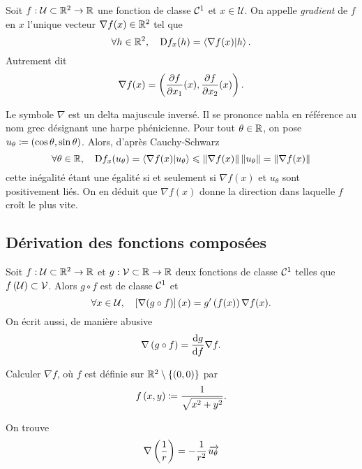 \documentclass{magnolia}
\begin{document}
\begin{definition}
Soit $f:\mathcal{U}\subset\mathbb{R}^2\to\mathbb{R}$ une fonction de classe $\mathcal{C}^{1}$ et
$x\in\mathcal{U}$. On appelle \emph{gradient} de $f$ en $x$ l'unique vecteur
$\nabla f(x)\in\mathbb{R}^2$ tel que
\[\forall h\in\mathbb{R}^2 ,\quad {\rm D}f_{x}(h)=\left\langle {\nabla f(x)}\middle|{h}\right\rangle.\]
Autrement dit
\[\nabla f(x)=\left(\frac{\partial f}{\partial x_1}(x),\frac{\partial f}{\partial x_2}(x)\right).\]
\end{definition}

\begin{remarques}
\remarque Le symbole $\nabla$ est un delta majuscule inversé. Il se prononce \og nabla \fg en référence au nom grec désignant une harpe phénicienne.
\remarque Pour tout $\theta\in\mathbb{R}$, on pose $u_\theta\coloneqq(\cos\theta,\sin\theta)$. Alors,
d'après Cauchy-Schwarz
\[\forall \theta\in\mathbb{R},\quad {\rm D}f_x(u_\theta)=\left\langle {\nabla f(x)}\middle|{u_\theta}\right\rangle \leqslant \left\|\nabla f(x)\right\|\left\|u_\theta\right\|=\left\|\nabla f(x)\right\|\]
cette inégalité étant une égalité si et seulement si $\nabla f(x)$ et $u_\theta$ sont
positivement liés. On en déduit que $\nabla f(x)$ donne la direction dans laquelle
$f$ croît le plus vite.
\end{remarques}


\subsection{Dérivation des fonctions composées}

\begin{proposition}
Soit $f:\mathcal{U}\subset\mathbb{R}^2\to\mathbb{R}$ et $g:\mathcal{V}\subset\mathbb{R}\to\mathbb{R}$ deux
  fonctions de classe $\mathcal{C}^{1}$ telles que
  $f\left(\mathcal{U}\right)\subset\mathcal{V}$. Alors $g\circ f$ est de classe
  $\mathcal{C}^{1}$ et
  \[\forall x\in\mathcal{U} ,\quad
    \left[\nabla (g\circ f)\right] (x)=g'\left(f(x)\right)\nabla f(x).\]
  On écrit aussi, de manière abusive
  \[\nabla\left(g\circ f\right)=\frac{{\rm d}g}{{\rm d}f}\nabla f.\]
\end{proposition}


\begin{exoUnique}
\exo Calculer $\nabla f$, où $f$ est définie sur
  $\mathbb{R}^2\setminus\left\{\left(0,0\right)\right\}$ par
  \[f\left(x,y\right)\coloneqq\frac{1}{\sqrt{x^2+y^2}}.\]
  \begin{sol}
  On trouve
  \[\nabla\left(\frac{1}{r}\right)=-\frac{1}{r^2}\kern 2pt\overrightarrow{\kern -2ptu_\theta}\]
  \end{sol}
\end{exoUnique}

\end{document}
